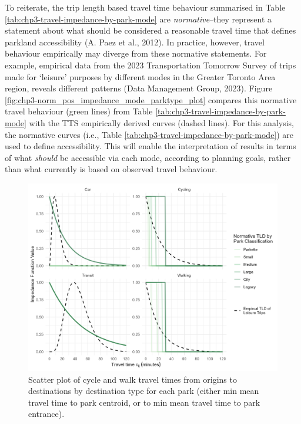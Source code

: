 \documentclass[
11pt, %
oneside, %
english, %
singlespacing, %
]{macthesis} %
\begin{document}
To reiterate, the trip length based travel time behaviour summarised in Table \ref{tab:chp3-travel-impedance-by-park-mode} are \emph{normative}--they represent a statement about what should be considered a reasonable travel time that defines parkland accessibility (A. Paez et al., 2012). In practice, however, travel behaviour empirically may diverge from these normative statements. For example, empirical data from the 2023 Transportation Tomorrow Survey of trips made for `leisure' purposes by different modes in the Greater Toronto Area region, reveals different patterns (Data Management Group, 2023). Figure \ref{fig:chp3-norm_pos_impedance_mode_parktype_plot} compares this normative travel behaviour (green lines) from Table \ref{tab:chp3-travel-impedance-by-park-mode} with the TTS empirically derived curves (dashed lines). For this analysis, the normative curves (i.e., Table \ref{tab:chp3-travel-impedance-by-park-mode}) are used to define accessibility. This will enable the interpretation of results in terms of what \emph{should} be accessible via each mode, according to planning goals, rather than what currently is based on observed travel behaviour.

\begin{figure}

{\centering \includegraphics[width=6in]{./data/figures/chp3-norm_pos_impedance_mode_parktype_plot} 

}

\caption{\label{fig:chp3-norm_pos_impedance_mode_parktype_plot}  Scatter plot of cycle and walk travel times from origins to destinations by destination type for each park (either min mean travel time to park centroid, or to min mean travel time to park entrance). }\label{fig:unnamed-chunk-50}
\end{figure}
\end{document}

